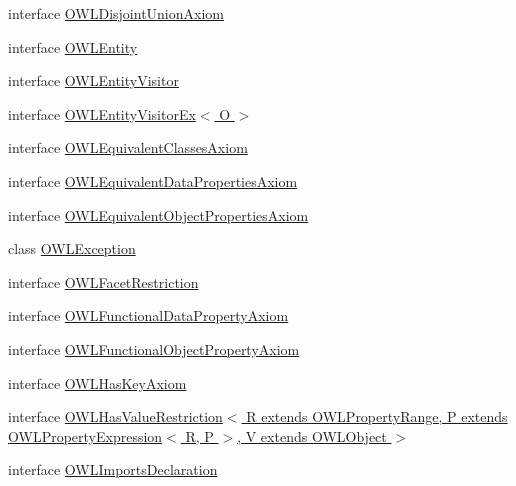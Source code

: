 \begin{DoxyCompactItemize}
interface \hyperlink{interfaceorg_1_1semanticweb_1_1owlapi_1_1model_1_1_o_w_l_disjoint_union_axiom}{O\-W\-L\-Disjoint\-Union\-Axiom}
\item 
interface \hyperlink{interfaceorg_1_1semanticweb_1_1owlapi_1_1model_1_1_o_w_l_entity}{O\-W\-L\-Entity}
\item 
interface \hyperlink{interfaceorg_1_1semanticweb_1_1owlapi_1_1model_1_1_o_w_l_entity_visitor}{O\-W\-L\-Entity\-Visitor}
\item 
interface \hyperlink{interfaceorg_1_1semanticweb_1_1owlapi_1_1model_1_1_o_w_l_entity_visitor_ex_3_01_o_01_4}{O\-W\-L\-Entity\-Visitor\-Ex$<$ O $>$}
\item 
interface \hyperlink{interfaceorg_1_1semanticweb_1_1owlapi_1_1model_1_1_o_w_l_equivalent_classes_axiom}{O\-W\-L\-Equivalent\-Classes\-Axiom}
\item 
interface \hyperlink{interfaceorg_1_1semanticweb_1_1owlapi_1_1model_1_1_o_w_l_equivalent_data_properties_axiom}{O\-W\-L\-Equivalent\-Data\-Properties\-Axiom}
\item 
interface \hyperlink{interfaceorg_1_1semanticweb_1_1owlapi_1_1model_1_1_o_w_l_equivalent_object_properties_axiom}{O\-W\-L\-Equivalent\-Object\-Properties\-Axiom}
\item 
class \hyperlink{classorg_1_1semanticweb_1_1owlapi_1_1model_1_1_o_w_l_exception}{O\-W\-L\-Exception}
\item 
interface \hyperlink{interfaceorg_1_1semanticweb_1_1owlapi_1_1model_1_1_o_w_l_facet_restriction}{O\-W\-L\-Facet\-Restriction}
\item 
interface \hyperlink{interfaceorg_1_1semanticweb_1_1owlapi_1_1model_1_1_o_w_l_functional_data_property_axiom}{O\-W\-L\-Functional\-Data\-Property\-Axiom}
\item 
interface \hyperlink{interfaceorg_1_1semanticweb_1_1owlapi_1_1model_1_1_o_w_l_functional_object_property_axiom}{O\-W\-L\-Functional\-Object\-Property\-Axiom}
\item 
interface \hyperlink{interfaceorg_1_1semanticweb_1_1owlapi_1_1model_1_1_o_w_l_has_key_axiom}{O\-W\-L\-Has\-Key\-Axiom}
\item 
interface \hyperlink{interfaceorg_1_1semanticweb_1_1owlapi_1_1model_1_1_o_w_l_has_value_restriction_3_01_r_01extends_ddd6bdb2056f68eb0b170ea0a444249e}{O\-W\-L\-Has\-Value\-Restriction$<$ R extends O\-W\-L\-Property\-Range, P extends O\-W\-L\-Property\-Expression$<$ R, P $>$, V extends O\-W\-L\-Object $>$}
\item 
interface \hyperlink{interfaceorg_1_1semanticweb_1_1owlapi_1_1model_1_1_o_w_l_imports_declaration}{O\-W\-L\-Imports\-Declaration}

\end{DoxyCompactItemize}
